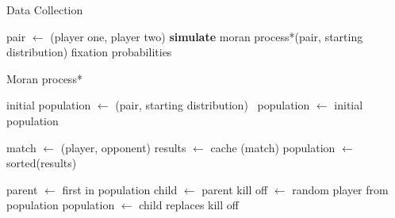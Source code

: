 \documentclass{article}
\begin{document}
\begin{algorithm}
\caption{Data Collection}
  \begin{algorithmic}[1]
        \STATE pair $\gets$ (player one, player two)
        \STATE \textbf{simulate} moran process*(pair, starting distribution)        
        \ENDWHILE
        \RETURN fixation probabilities      
        \ENDFOR
      \ENDFOR
    \ENDFOR
  \end{algorithmic}
\end{algorithm}

\begin{algorithm}
\caption{Moran process*}
  \begin{algorithmic}[1]
  \STATE initial population $\gets$ (pair, starting distribution) \
  \STATE population $\gets$ initial population

        \STATE match $\gets$ (player, opponent)
        \STATE results $\gets$ cache (match) 
        \ENDFOR
      \ENDFOR
      \STATE population $\gets$ sorted(results)

      \STATE parent $\gets$  first in population 
      \STATE child $\gets$ parent
      \STATE kill off $\gets$ random player from population
      \STATE population $\gets$   child replaces kill off
    \ENDWHILE
  \end{algorithmic}
\end{algorithm}
\end{document}

